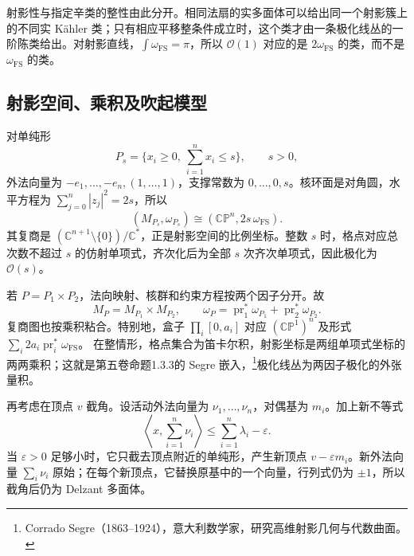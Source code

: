 射影性与指定辛类的整性由此分开。相同法扇的实多面体可以给出同一个射影簇上的不同实 Kähler 类；只有相应平移整条件成立时，这个类才由一条极化线丛的一阶陈类给出。对射影直线，\(\int\omega_{\mathrm{FS}}=\pi\)，所以 \(\mathcal O(1)\) 对应的是 \(2\omega_{\mathrm{FS}}\) 的类，而不是 \(\omega_{\mathrm{FS}}\) 的类。

\subsection{射影空间、乘积及吹起模型}
\label{g4:subsec:1205:03}

对单纯形
\[
	P_s=\{x_i\ge0,\ \sum_{i=1}^n x_i\le s\},\qquad s>0,
\]
外法向量为 \(-e_1,\ldots,-e_n,(1,\ldots,1)\)，支撑常数为 \(0,\ldots,0,s\)。核环面是对角圆，水平方程为 \(\sum_{j=0}^n|z_j|^2=2s\)，所以
\begin{equation}\label{g4:eq:1205:simplex-projective}
	(M_{P_s},\omega_{P_s})\cong
	(\mathbb{CP}^n,2s\,\omega_{\mathrm{FS}}).
\end{equation}
其复商是 \((\mathbb C^{n+1}\setminus\{0\})/\mathbb C^*\)，正是射影空间的比例坐标。整数 \(s\) 时，格点对应总次数不超过 \(s\) 的仿射单项式，齐次化后为全部 \(s\) 次齐次单项式，因此极化为 \(\mathcal O(s)\)。

\ProseParagraphBreak

若 \(P=P_1\times P_2\)，法向映射、核群和约束方程按两个因子分开。故
\[
	M_P=M_{P_1}\times M_{P_2},\qquad
	\omega_P=\operatorname{pr}_1^*\omega_{P_1}
	+\operatorname{pr}_2^*\omega_{P_2}.
\]
复商图也按乘积粘合。特别地，盒子 \(\prod_i[0,a_i]\) 对应
\((\mathbb{CP}^1)^n\) 及形式 \(\sum_i2a_i\operatorname{pr}_i^*\omega_{\mathrm{FS}}\)。
在整情形，格点集合为笛卡尔积，射影坐标是两组单项式坐标的两两乘积；这就是第五卷命题1.3.3的 Segre 嵌入，\footnote{Corrado Segre（1863--1924），意大利数学家，研究高维射影几何与代数曲面。}极化线丛为两因子极化的外张量积。

\ProseParagraphBreak

再考虑在顶点 \(v\) 截角。设活动外法向量为 \(\nu_1,\ldots,\nu_n\)，对偶基为 \(m_i\)。加上新不等式
\begin{equation}\label{g4:eq:1205:corner-cut}
	\left\langle x,\sum_{i=1}^n\nu_i\right\rangle
	\le\sum_{i=1}^n\lambda_i-\varepsilon.
\end{equation}
当 \(\varepsilon>0\) 足够小时，它只截去顶点附近的单纯形，产生新顶点 \(v-\varepsilon m_i\)。新外法向量 \(\sum_i\nu_i\) 原始；在每个新顶点，它替换原基中的一个向量，行列式仍为 \(\pm1\)，所以截角后仍为 Delzant 多面体。


